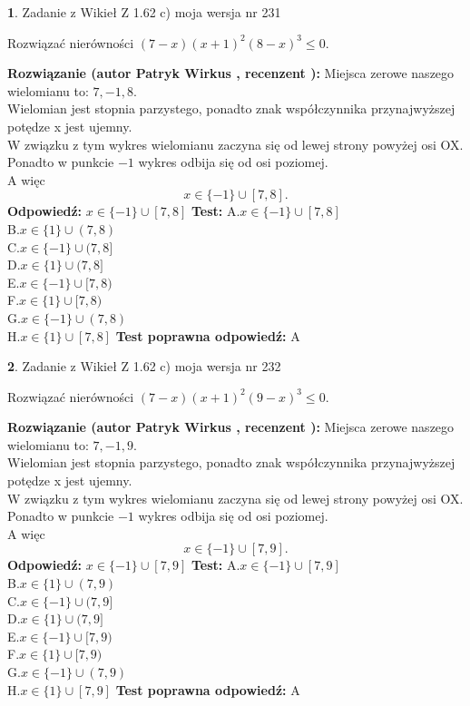 \documentclass[12pt, a4paper]{article}
\theoremstyle{definition} %
\newtheorem{zad}{}
\newcommand{\zadStart}[1]{\begin{zad}#1\newline}
\newcommand{\zadStop}{\end{zad}}
\newcommand{\rozwStart}[2]{\noindent \textbf{Rozwiązanie (autor #1 , recenzent #2): }\newline}
\newcommand{\rozwStop}{\newline}
\newcommand{\odpStart}{\noindent \textbf{Odpowiedź:}\newline}
\newcommand{\odpStop}{\newline}
\newcommand{\testStart}{\noindent \textbf{Test:}\newline}
\newcommand{\testStop}{\newline}
\newcommand{\kluczStart}{\noindent \textbf{Test poprawna odpowiedź:}\newline}
\newcommand{\kluczStop}{\newline}
\begin{document}
\zadStart{Zadanie z Wikieł Z 1.62 c) moja wersja nr 231}

Rozwiązać nierówności $(7-x)(x+1)^{2}(8-x)^{3}\le0$.
\zadStop
\rozwStart{Patryk Wirkus}{}
Miejsca zerowe naszego wielomianu to: $7, -1, 8$.\\
Wielomian jest stopnia parzystego, ponadto znak współczynnika przy\linebreak najwyższej potędze x jest ujemny.\\ W związku z tym wykres wielomianu zaczyna się od lewej strony powyżej osi OX.\\
Ponadto w punkcie $-1$ wykres odbija się od osi poziomej.\\
A więc $$x \in \{-1\} \cup [7,8].$$
\rozwStop
\odpStart
$x \in \{-1\} \cup [7,8]$
\odpStop
\testStart
A.$x \in \{-1\} \cup [7,8]$\\
B.$x \in \{1\} \cup (7,8)$\\
C.$x \in \{-1\} \cup (7,8]$\\
D.$x \in \{1\} \cup (7,8]$\\
E.$x \in \{-1\} \cup [7,8)$\\
F.$x \in \{1\} \cup [7,8)$\\
G.$x \in \{-1\} \cup (7,8)$\\
H.$x \in \{1\} \cup [7,8]$
\testStop
\kluczStart
A
\kluczStop



\zadStart{Zadanie z Wikieł Z 1.62 c) moja wersja nr 232}

Rozwiązać nierówności $(7-x)(x+1)^{2}(9-x)^{3}\le0$.
\zadStop
\rozwStart{Patryk Wirkus}{}
Miejsca zerowe naszego wielomianu to: $7, -1, 9$.\\
Wielomian jest stopnia parzystego, ponadto znak współczynnika przy\linebreak najwyższej potędze x jest ujemny.\\ W związku z tym wykres wielomianu zaczyna się od lewej strony powyżej osi OX.\\
Ponadto w punkcie $-1$ wykres odbija się od osi poziomej.\\
A więc $$x \in \{-1\} \cup [7,9].$$
\rozwStop
\odpStart
$x \in \{-1\} \cup [7,9]$
\odpStop
\testStart
A.$x \in \{-1\} \cup [7,9]$\\
B.$x \in \{1\} \cup (7,9)$\\
C.$x \in \{-1\} \cup (7,9]$\\
D.$x \in \{1\} \cup (7,9]$\\
E.$x \in \{-1\} \cup [7,9)$\\
F.$x \in \{1\} \cup [7,9)$\\
G.$x \in \{-1\} \cup (7,9)$\\
H.$x \in \{1\} \cup [7,9]$
\testStop
\kluczStart
A
\kluczStop
\end{document}
